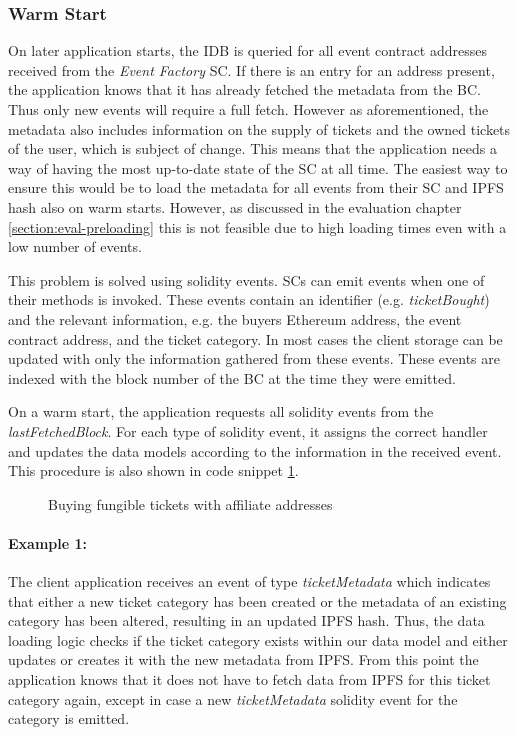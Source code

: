 \subsubsection{Warm Start}

On later application starts, the IDB is queried for all event contract addresses received from the \textit{Event Factory} SC. If there is an entry for an address present, the application knows that it has already fetched the metadata from the BC. Thus only new events will require a full fetch. However as aforementioned, the metadata also includes information on the supply of tickets and the owned tickets of the user, which is subject of change. This means that the application needs a way of having the most up-to-date state of the SC at all time. The easiest way to ensure this would be to load the metadata for all events from their SC and IPFS hash also on warm starts. However, as discussed in the evaluation chapter \ref{section:eval-preloading} this is not feasible due to high loading times even with a low number of events.

This problem is solved using solidity events. SCs can emit events when one of their methods is invoked. These events contain an identifier (e.g. \textit{ticketBought}) and the relevant information, e.g. the buyers Ethereum address, the event contract address, and the ticket category. In most cases the client storage can be updated with only the information gathered from these events. These events are indexed with the block number of the BC at the time they were emitted.

On a warm start, the application requests all solidity events from the \textit{lastFetchedBlock}. For each type of solidity event, it assigns the correct handler and updates the data models according to the information in the received event. This procedure is also shown in code snippet \ref{code:eventLoading}.

\begin{figure}[H]
    
    \caption{Buying fungible tickets with affiliate addresses}
    \label{code:eventLoading}
\end{figure}

\paragraph{Example 1:} The client application receives an event of type \textit{ticketMetadata} which indicates that either a new ticket category has been created or the metadata of an existing category has been altered, resulting in an updated IPFS hash. Thus, the data loading logic checks if the ticket category exists within our data model and either updates or creates it with the new metadata from IPFS. From this point the application knows that it does not have to fetch data from IPFS for this ticket category again, except in case a new \textit{ticketMetadata} solidity event for the category is emitted. 


